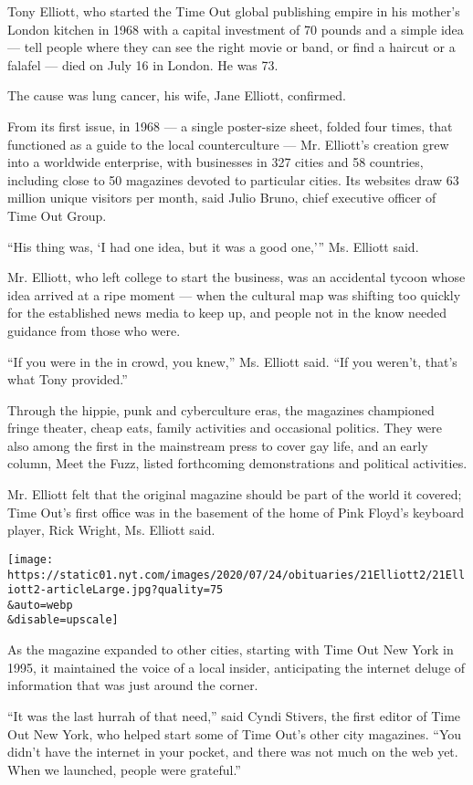 Tony Elliott, who started the Time Out global publishing empire in his
mother's London kitchen in 1968 with a capital investment of 70 pounds
and a simple idea --- tell people where they can see the right movie or
band, or find a haircut or a falafel --- died on July 16 in London. He
was 73.

The cause was lung cancer, his wife, Jane Elliott, confirmed.

From its first issue, in 1968 --- a single poster-size sheet, folded
four times, that functioned as a guide to the local counterculture ---
Mr. Elliott's creation grew into a worldwide enterprise, with businesses
in 327 cities and 58 countries, including close to 50 magazines devoted
to particular cities. Its websites draw 63 million unique visitors per
month, said Julio Bruno, chief executive officer of Time Out Group.

``His thing was, `I had one idea, but it was a good one,''' Ms. Elliott
said.

Mr. Elliott, who left college to start the business, was an accidental
tycoon whose idea arrived at a ripe moment --- when the cultural map was
shifting too quickly for the established news media to keep up, and
people not in the know needed guidance from those who were.

``If you were in the in crowd, you knew,'' Ms. Elliott said. ``If you
weren't, that's what Tony provided.''

Through the hippie, punk and cyberculture eras, the magazines championed
fringe theater, cheap eats, family activities and occasional politics.
They were also among the first in the mainstream press to cover gay
life, and an early column, Meet the Fuzz, listed forthcoming
demonstrations and political activities.

Mr. Elliott felt that the original magazine should be part of the world
it covered; Time Out's first office was in the basement of the home of
Pink Floyd's keyboard player, Rick Wright, Ms. Elliott said.

\texttt{[image: https://static01.nyt.com/images/2020/07/24/obituaries/21Elliott2/21Elliott2-articleLarge.jpg?quality=75\\\&auto=webp\\\&disable=upscale]}

As the magazine expanded to other cities, starting with Time Out New
York in 1995, it maintained the voice of a local insider, anticipating
the internet deluge of information that was just around the corner.

``It was the last hurrah of that need,'' said Cyndi Stivers, the first
editor of Time Out New York, who helped start some of Time Out's other
city magazines. ``You didn't have the internet in your pocket, and there
was not much on the web yet. When we launched, people were grateful.''

